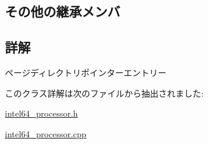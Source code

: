 \subsection*{その他の継承メンバ}


\subsection{詳解}
ページディレクトリポインターエントリー 

このクラス詳解は次のファイルから抽出されました\+:\begin{DoxyCompactItemize}
\item 
\hyperlink{intel64__processor_8h}{intel64\+\_\+processor.\+h}\item 
\hyperlink{intel64__processor_8cpp}{intel64\+\_\+processor.\+cpp}\end{DoxyCompactItemize}
